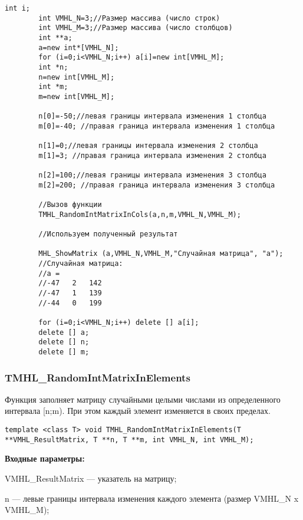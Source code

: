 \documentclass[a4paper,12pt]{article}
\begin{document}
\begin{lstlisting}[label=code_use_TMHL_RandomIntMatrixInCols,caption=Пример использования]
        int i;
        int VMHL_N=3;//Размер массива (число строк)
        int VMHL_M=3;//Размер массива (число столбцов)
        int **a;
        a=new int*[VMHL_N];
        for (i=0;i<VMHL_N;i++) a[i]=new int[VMHL_M];
        int *n;
        n=new int[VMHL_M];
        int *m;
        m=new int[VMHL_M];

        n[0]=-50;//левая границы интервала изменения 1 столбца
        m[0]=-40; //правая граница интервала изменения 1 столбца

        n[1]=0;//левая границы интервала изменения 2 столбца
        m[1]=3; //правая граница интервала изменения 2 столбца

        n[2]=100;//левая границы интервала изменения 3 столбца
        m[2]=200; //правая граница интервала изменения 3 столбца

        //Вызов функции
        TMHL_RandomIntMatrixInCols(a,n,m,VMHL_N,VMHL_M);

        //Используем полученный результат

        MHL_ShowMatrix (a,VMHL_N,VMHL_M,"Случайная матрица", "a");
        //Случайная матрица:
        //a =
        //-47	2	142
        //-47	1	139
        //-44	0	199

        for (i=0;i<VMHL_N;i++) delete [] a[i];
        delete [] a;
        delete [] n;
        delete [] m;
\end{lstlisting}

\subsubsection{TMHL\_RandomIntMatrixInElements}\label{TMHL_RandomIntMatrixInElements}

Функция заполняет матрицу случайными целыми числами из определенного интервала [n;m). При этом каждый элемент изменяется в своих пределах.


\begin{lstlisting}[label=code_syntax_TMHL_RandomIntMatrixInElements,caption=Синтаксис]
template <class T> void TMHL_RandomIntMatrixInElements(T **VMHL_ResultMatrix, T **n, T **m, int VMHL_N, int VMHL_M);
\end{lstlisting}

\textbf{Входные параметры:}
 
VMHL\_ResultMatrix --- указатель на матрицу;
 
n --- левые границы интервала изменения каждого элемента (размер VMHL\_N x VMHL\_M);
 
\end{document}
